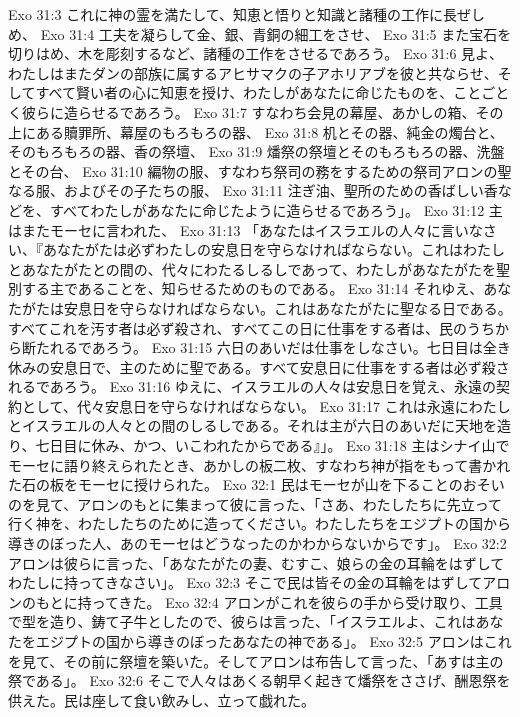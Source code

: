 Exo 31:3  これに神の霊を満たして、知恵と悟りと知識と諸種の工作に長ぜしめ、
Exo 31:4  工夫を凝らして金、銀、青銅の細工をさせ、
Exo 31:5  また宝石を切りはめ、木を彫刻するなど、諸種の工作をさせるであろう。
Exo 31:6  見よ、わたしはまたダンの部族に属するアヒサマクの子アホリアブを彼と共ならせ、そしてすべて賢い者の心に知恵を授け、わたしがあなたに命じたものを、ことごとく彼らに造らせるであろう。
Exo 31:7  すなわち会見の幕屋、あかしの箱、その上にある贖罪所、幕屋のもろもろの器、
Exo 31:8  机とその器、純金の燭台と、そのもろもろの器、香の祭壇、
Exo 31:9  燔祭の祭壇とそのもろもろの器、洗盤とその台、
Exo 31:10  編物の服、すなわち祭司の務をするための祭司アロンの聖なる服、およびその子たちの服、
Exo 31:11  注ぎ油、聖所のための香ばしい香などを、すべてわたしがあなたに命じたように造らせるであろう」。
Exo 31:12  主はまたモーセに言われた、
Exo 31:13  「あなたはイスラエルの人々に言いなさい、『あなたがたは必ずわたしの安息日を守らなければならない。これはわたしとあなたがたとの間の、代々にわたるしるしであって、わたしがあなたがたを聖別する主であることを、知らせるためのものである。
Exo 31:14  それゆえ、あなたがたは安息日を守らなければならない。これはあなたがたに聖なる日である。すべてこれを汚す者は必ず殺され、すべてこの日に仕事をする者は、民のうちから断たれるであろう。
Exo 31:15  六日のあいだは仕事をしなさい。七日目は全き休みの安息日で、主のために聖である。すべて安息日に仕事をする者は必ず殺されるであろう。
Exo 31:16  ゆえに、イスラエルの人々は安息日を覚え、永遠の契約として、代々安息日を守らなければならない。
Exo 31:17  これは永遠にわたしとイスラエルの人々との間のしるしである。それは主が六日のあいだに天地を造り、七日目に休み、かつ、いこわれたからである』」。
Exo 31:18  主はシナイ山でモーセに語り終えられたとき、あかしの板二枚、すなわち神が指をもって書かれた石の板をモーセに授けられた。
Exo 32:1  民はモーセが山を下ることのおそいのを見て、アロンのもとに集まって彼に言った、「さあ、わたしたちに先立って行く神を、わたしたちのために造ってください。わたしたちをエジプトの国から導きのぼった人、あのモーセはどうなったのかわからないからです」。
Exo 32:2  アロンは彼らに言った、「あなたがたの妻、むすこ、娘らの金の耳輪をはずしてわたしに持ってきなさい」。
Exo 32:3  そこで民は皆その金の耳輪をはずしてアロンのもとに持ってきた。
Exo 32:4  アロンがこれを彼らの手から受け取り、工具で型を造り、鋳て子牛としたので、彼らは言った、「イスラエルよ、これはあなたをエジプトの国から導きのぼったあなたの神である」。
Exo 32:5  アロンはこれを見て、その前に祭壇を築いた。そしてアロンは布告して言った、「あすは主の祭である」。
Exo 32:6  そこで人々はあくる朝早く起きて燔祭をささげ、酬恩祭を供えた。民は座して食い飲みし、立って戯れた。
